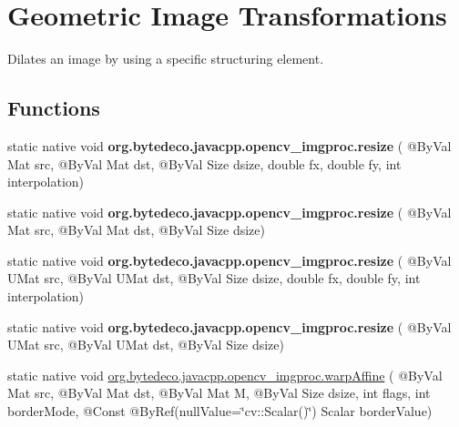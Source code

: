 \hypertarget{group__imgproc__transform}{}\section{Geometric Image Transformations}
\label{group__imgproc__transform}


Dilates an image by using a specific structuring element.  


\subsection*{Functions}
\begin{DoxyCompactItemize}
\item 
\mbox{\label{group__imgproc__transform_gaf6e6a7904dfb1520bdbe0026635d6dcb}} 
static native void {\bfseries org.\+bytedeco.\+javacpp.\+opencv\+\_\+imgproc.\+resize} ( @By\+Val Mat src, @By\+Val Mat dst, @By\+Val Size dsize, double fx, double fy, int interpolation)
\item 
\mbox{\label{group__imgproc__transform_ga0a829b34ea8a113115aef6a34873c869}} 
static native void {\bfseries org.\+bytedeco.\+javacpp.\+opencv\+\_\+imgproc.\+resize} ( @By\+Val Mat src, @By\+Val Mat dst, @By\+Val Size dsize)
\item 
\mbox{\label{group__imgproc__transform_ga875fbff2d2c09dd9f1cf364396a950c9}} 
static native void {\bfseries org.\+bytedeco.\+javacpp.\+opencv\+\_\+imgproc.\+resize} ( @By\+Val U\+Mat src, @By\+Val U\+Mat dst, @By\+Val Size dsize, double fx, double fy, int interpolation)
\item 
\mbox{\label{group__imgproc__transform_gadd9b4cfaff5be01de283dca4fd493e3d}} 
static native void {\bfseries org.\+bytedeco.\+javacpp.\+opencv\+\_\+imgproc.\+resize} ( @By\+Val U\+Mat src, @By\+Val U\+Mat dst, @By\+Val Size dsize)
\item 
static native void \hyperlink{group__imgproc__transform_ga0f7c28988998c3ae473a6708bdeef114}{org.\+bytedeco.\+javacpp.\+opencv\+\_\+imgproc.\+warp\+Affine} ( @By\+Val Mat src, @By\+Val Mat dst, @By\+Val Mat M, @By\+Val Size dsize, int flags, int border\+Mode, @Const @By\+Ref(null\+Value=\char`\"{}cv\+::\+Scalar()\char`\"{}) Scalar border\+Value)

\end{DoxyCompactItemize}

